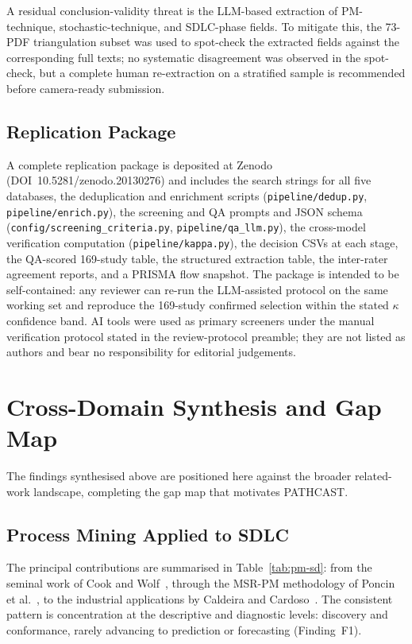 

A residual conclusion-validity threat is the LLM-based extraction of
PM-technique, stochastic-technique, and SDLC-phase fields. To mitigate this,
the 73-PDF triangulation subset was used to spot-check the extracted fields
against the corresponding full texts; no systematic disagreement was
observed in the spot-check, but a complete human re-extraction on a
stratified sample is recommended before camera-ready submission.


\subsection{Replication Package}
\label{sec:slr-replication}

A complete replication package is deposited at Zenodo (DOI~10.5281/zenodo.20130276)
and includes the search strings for all five databases, the deduplication and
enrichment scripts (\texttt{pipeline/dedup.py}, \texttt{pipeline/enrich.py}),
the screening and QA prompts and JSON schema
(\texttt{config/screening\_criteria.py}, \texttt{pipeline/qa\_llm.py}),
the cross-model verification computation (\texttt{pipeline/kappa.py}),
the decision CSVs at each stage, the QA-scored 169-study table, the
structured extraction table, the inter-rater agreement reports, and a
PRISMA flow snapshot. The package is intended to be self-contained: any
reviewer can re-run the LLM-assisted protocol on the same working set and
reproduce the 169-study confirmed selection within the stated $\kappa$
confidence band. AI tools were used as primary screeners under the manual
verification protocol stated in the review-protocol preamble; they are
not listed as authors and bear no responsibility for editorial
judgements.


\section{Cross-Domain Synthesis and Gap Map}
\label{sec:slr-related-work}

The findings synthesised above are positioned here against the broader
related-work landscape, completing the gap map that motivates PATHCAST.

\subsection{Process Mining Applied to SDLC}

The principal contributions are summarised in Table~\ref{tab:pm-sd}: from
the seminal work of Cook and Wolf~\cite{cook1998}, through the MSR-PM
methodology of Poncin et al.~\cite{poncin2011process}, to the industrial
applications by Caldeira and Cardoso~\cite{Caldeira2019AssessingSoftwareTeams}.
The consistent pattern is concentration at the descriptive and diagnostic
levels: discovery and conformance, rarely advancing to prediction or
forecasting (Finding~F1).

